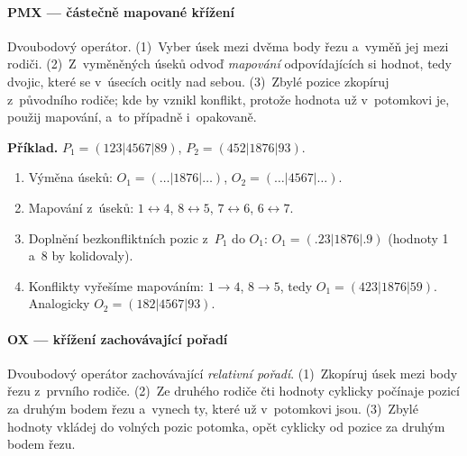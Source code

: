 \documentclass[11pt,a4paper]{article}
\theoremstyle{definition}
\begin{document}
\paragraph{PMX --- částečně mapované křížení}

\begin{defbox}
Dvoubodový operátor. (1)~Vyber úsek mezi dvěma body řezu a~vyměň jej mezi rodiči.
(2)~Z~vyměněných úseků odvoď \emph{mapování} odpovídajících si hodnot, tedy dvojic, které
se v~úsecích ocitly nad sebou. (3)~Zbylé pozice zkopíruj z~původního rodiče; kde by vznikl
konflikt, protože hodnota už v~potomkovi je, použij mapování, a~to případně i~opakovaně.
\end{defbox}

\textbf{Příklad.} $P_1 = (123|4567|89)$, $P_2 = (452|1876|93)$.
\begin{enumerate}
\item Výměna úseků: $O_1 = (\ldots|1876|\ldots)$, $O_2 = (\ldots|4567|\ldots)$.
\item Mapování z~úseků: $1{\leftrightarrow}4$, $8{\leftrightarrow}5$,
  $7{\leftrightarrow}6$, $6{\leftrightarrow}7$.
\item Doplnění bezkonfliktních pozic z~$P_1$ do $O_1$:
  $O_1 = (.23|1876|.9)$ (hodnoty 1 a~8 by kolidovaly).
\item Konflikty vyřešíme mapováním: $1 \to 4$, $8 \to 5$, tedy
  $O_1 = (423|1876|59)$. Analogicky $O_2 = (182|4567|93)$.
\end{enumerate}

\paragraph{OX --- křížení zachovávající pořadí}

\begin{defbox}
Dvoubodový operátor zachovávající \emph{relativní pořadí}. (1)~Zkopíruj úsek mezi body
řezu z~prvního rodiče. (2)~Ze druhého rodiče čti hodnoty cyklicky počínaje pozicí za
druhým bodem řezu a~vynech ty, které už v~potomkovi jsou. (3)~Zbylé hodnoty vkládej do
volných pozic potomka, opět cyklicky od pozice za druhým bodem řezu.
\end{defbox}
\end{document}
